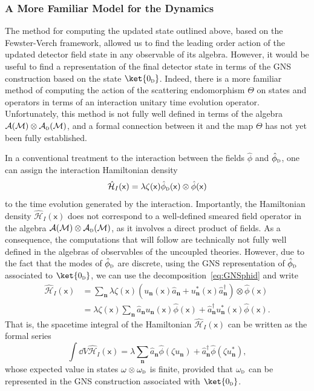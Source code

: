 \documentclass[letterpaper,12pt,titlepage,oneside,final]{book}
\newcommand{\M}{\mathcal{M}}
\newcommand{\mf}{\mathsf}%
\newcommand{\tc}[1]{\textsc{#1}}
\begin{document}
\subsubsection*{A More Familiar Model for the Dynamics}

The method for computing the updated state outlined above, based on the Fewster-Verch framework, allowed us to find the leading order action of the updated detector field state in any observable of its algebra. However, it would be useful to find a representation of the final detector state in terms of the GNS construction based on the state $\ket{0_\tc{d}}$. Indeed, there is a more familiar method of computing the action of the scattering endomorphism $\Theta$ on states and operators in terms of an interaction unitary time evolution operator. Unfortunately, this method is not fully well defined in terms of the algebra $\mathcal{A}(\M)\otimes\mathcal{A}_\tc{d}(\M)$, and a formal connection between it and the map $\Theta$ has not yet been fully established.

In a conventional treatment to the interaction between the fields $\hat{\phi}$ and $\hat{\phi}_\tc{d}$, one can assign the interaction Hamiltonian density
\begin{equation}
    \hat{\mathcal{H}}_I(\mf x) = \lambda \zeta(\mf x) \hat{\phi}_{\tc{d}}(\mf x)\otimes \hat{\phi}(\mf x)
\end{equation}
to the time evolution generated by the interaction. Importantly, the Hamiltonian density $\hat{\mathcal{H}}_I(\mf x)$ does not correspond to a well-defined smeared field operator in the algebra $\mathcal{A}(\M)\otimes\mathcal{A}_\tc{d}(\M)$, as it involves a direct product of fields. As a consequence, the computations that will follow are technically not fully well defined in the algebras of observables of the uncoupled theories. However, due to the fact that the modes of $\hat{\phi}_\tc{d}$ are discrete, using the GNS representation of $\hat{\phi}_\tc{d}$ associated to $\ket{0_\tc{d}}$, we can use the decomposition~\eqref{eq:GNSphid} and write
\begin{align}
    \hat{\mathcal{H}}_I(\mf x) &= \sum_{\bm n}\lambda \zeta(\mf x)(u_{\bm n}(\mf x)\hat{a}_{\bm n} + u_{\bm n}^*(\mf x) \hat{a}_{\bm n}^\dagger)\otimes \hat{\phi}(\mf x)\\
    &= \lambda\zeta(\mf x)\sum_{\bm n} \hat{a}_{\bm n} u_{\bm n}(\mf x)\hat{\phi}(\mf x) +  \hat{a}_{\bm n}^\dagger  u_{\bm n}^*(\mf x)\hat{\phi}(\mf x).
\end{align}
That is, the spacetime integral of the Hamiltonian $\hat{\mathcal{H}}_I(\mf x)$ can be written as the formal series
\begin{equation}
    \int \dd V \hat{\mathcal{H}}_I(\mf x) = \lambda\sum_{\bm n} \hat{a}_{\bm n} \hat{\phi}(\zeta u_{\bm n})+\hat{a}_{\bm n}^\dagger \hat{\phi}(\zeta u_{\bm n}^*),
\end{equation}
whose expected value in states $\omega\otimes\omega_\tc{d}$ is finite, provided that $\omega_\tc{d}$ can be represented in the GNS construction associated with $\ket{0_\tc{d}}$.
\end{document}
